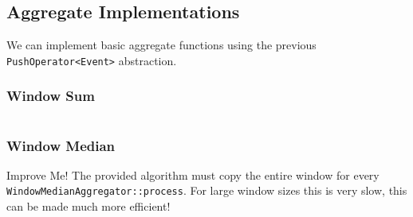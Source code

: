 \subsection{Aggregate Implementations}
We can implement basic aggregate functions using the previous \texttt{PushOperator<Event>} abstraction.
\subsubsection{Window Sum}
\inputminted{cpp}{streams/code/streams/operators/window_sum.h}

\subsubsection{Window Median}
\begin{sidenotebox}{Improve Me!}
    The provided algorithm must copy the entire window for every \texttt{WindowMedianAggregator::process}. For large window sizes this is very slow, this can be made much more efficient!
\end{sidenotebox}
\inputminted{cpp}{streams/code/streams/operators/window_median.h}


